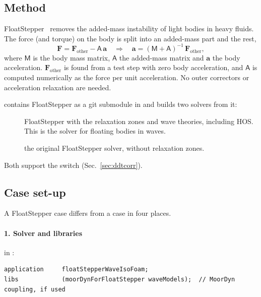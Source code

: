 \subsection{Method}
FloatStepper~\cite{roenby2024robust} removes the added-mass instability of light bodies in heavy
fluids. The force (and torque) on the body is split into an added-mass part and the rest,
\begin{equation}
  \mathbf F = \mathbf F_\mathrm{other} - \mathsf A\,\mathbf a
  \quad\Rightarrow\quad
  \mathbf a = (\mathsf M + \mathsf A)^{-1}\,\mathbf F_\mathrm{other},
\end{equation}
where $\mathsf M$ is the body mass matrix, $\mathsf A$ the added-mass matrix and $\mathbf a$
the body acceleration. $\mathbf F_\mathrm{other}$ is found from a test step with zero body
acceleration, and $\mathsf A$ is computed numerically as the force per unit acceleration. No
outer correctors or acceleration relaxation are needed.

\fwt{} contains FloatStepper as a git submodule in
 and builds two solvers from it:
\begin{description}
  \item[] FloatStepper with the \wtwof{} relaxation zones and wave
    theories, including HOS. This is the solver for floating bodies in waves.
  \item[] the original FloatStepper solver, without relaxation zones.
\end{description}
Both support the  switch (Sec.~\ref{sec:ddtcorr}).

\subsection{Case set-up}
A FloatStepper case differs from a  case in four places.

\paragraph{1. Solver and libraries} in :
\begin{lstlisting}
application     floatStepperWaveIsoFoam;
libs            (moorDynForFloatStepper waveModels);  // MoorDyn coupling, if used
\end{lstlisting}

